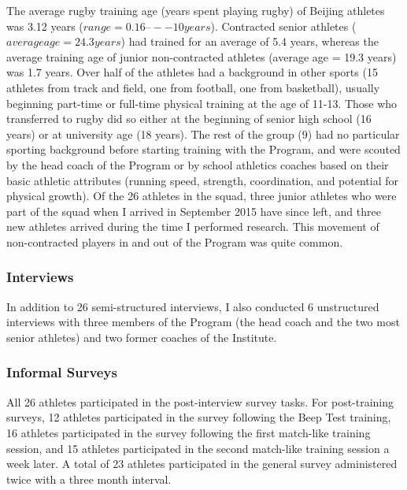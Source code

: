 The average rugby training age (years spent playing rugby) of Beijing athletes was 3.12 years ($range = 0.16 –-- 10 years$).  Contracted senior athletes ($average age = 24.3 years$) had trained for an average of 5.4 years, whereas the average training age of junior non-contracted athletes (average age = 19.3 years) was 1.7 years.  Over half of the athletes had a background in other sports (15 athletes from track and field, one from football, one from basketball), usually beginning part-time or full-time physical training at the age of 11-13.  Those who transferred to rugby did so either at the beginning of senior high school (16 years) or at university age (18 years).  The rest of the group (9) had no particular sporting background before starting training with the Program, and were scouted by the head coach of the Program or by school athletics coaches based on their basic athletic attributes (running speed, strength, coordination, and potential for physical growth).  Of the 26 athletes in the squad, three junior athletes who were part of the squad when I arrived in September 2015 have since left, and three new athletes arrived during the time I performed research. This movement of non-contracted players in and out of the Program was quite common.


  \subsubsection{Interviews}

  In addition to 26 semi-structured interviews, I also conducted 6 unstructured interviews with three members of the Program (the head coach and the two most senior athletes) and two former coaches of the Institute.

  \subsubsection{Informal Surveys}

  All 26 athletes participated in the post-interview survey tasks.  For post-training surveys, 12 athletes participated in the survey following the Beep Test training, 16 athletes participated in the survey following the first match-like training session, and 15 athletes participated in the second match-like training session a week later.  A total of 23 athletes participated in the general survey administered twice with a three month interval.







